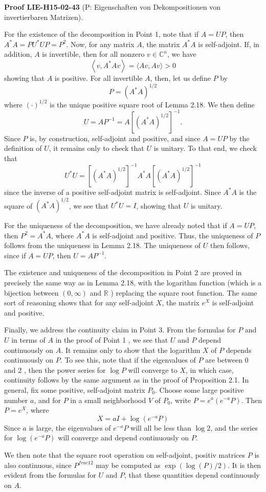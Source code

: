 \documentclass[10pt, letterpaper]{article}
\newcommand{\CustomHeading}[3]{%
  \par\medskip\noindent%
  \textbf{#1 #2} \textnormal{(#3)}.\enskip%
}
\newenvironment{PROOF}[2]{\begin{unitbox}\CustomHeading{Proof}{#1}{#2}}{\end{unitbox}}
\begin{document}
\begin{PROOF}{LIE-H15-02-43}{P: Eigenschaften von Dekompositionen von invertierbaren Matrizen}
For the existence of the decomposition in Point 1, note that if $A=U P$, then $A^{*} A=P U^{*} U P=P^{2}$. Now, for any matrix $A$, the matrix $A^{*} A$ is self-adjoint. If, in addition, $A$ is invertible, then for all nonzero $v \in \mathbb{C}^{n}$, we have
$$
\left\langle v, A^{*} A v\right\rangle=\langle A v, A v\rangle>0
$$
showing that $A$ is positive. For all invertible $A$, then, let us define $P$ by
$$
P=\left(A^{*} A\right)^{1 / 2}
$$
where $(\cdot)^{1 / 2}$ is the unique positive square root of Lemma 2.18. We then define
$$
U=A P^{-1}=A\left[\left(A^{*} A\right)^{1 / 2}\right]^{-1} .
$$
Since $P$ is, by construction, self-adjoint and positive, and since $A=U P$ by the definition of $U$, it remains only to check that $U$ is unitary. To that end, we check that
$$
U^{*} U=\left[\left(A^{*} A\right)^{1 / 2}\right]^{-1} A^{*} A\left[\left(A^{*} A\right)^{1 / 2}\right]^{-1}
$$
since the inverse of a positive self-adjoint matrix is self-adjoint. Since $A^{*} A$ is the square of $\left(A^{*} A\right)^{1 / 2}$, we see that $U^{*} U=I$, showing that $U$ is unitary.

For the uniqueness of the decomposition, we have already noted that if $A=U P$, then $P^{2}=A^{*} A$, where $A^{*} A$ is self-adjoint and positive. Thus, the uniqueness of $P$ follows from the uniqueness in Lemma 2.18. The uniqueness of $U$ then follows, since if $A=U P$, then $U=A P^{-1}$.

The existence and uniqueness of the decomposition in Point 2 are proved in precisely the same way as in Lemma 2.18, with the logarithm function (which is a bijection between $(0, \infty)$ and $\mathbb{R}$ ) replacing the square root function. The same sort of reasoning shows that for any self-adjoint $X$, the matrix $e^{X}$ is self-adjoint and positive.

Finally, we address the continuity claim in Point 3. From the formulas for $P$ and $U$ in terms of $A$ in the proof of Point 1 , we see that $U$ and $P$ depend continuously on $A$. It remains only to show that the logarithm $X$ of $P$ depends continuously on $P$. To see this, note that if the eigenvalues of $P$ are between 0 and 2 , then the power series for $\log P$ will converge to $X$, in which case, continuity follows by the same argument as in the proof of Proposition 2.1. In general, fix some positive, self-adjoint matrix $P_{0}$. Choose some large positive number $a$, and for $P$ in a small neighborhood $V$ of $P_{0}$, write $P=e^{a}\left(e^{-a} P\right)$. Then $P=e^{X}$, where
$$
X=a I+\log \left(e^{-a} P\right)
$$
Since $a$ is large, the eigenvalues of $e^{-a} P$ will all be less than $\log 2$, and the series for $\log \left(e^{-a} P\right)$ will converge and depend continuously on $P$.

We then note that the square root operation on self-adjoint, positiv matrices $P$ is also continuous, since $P^{frac{1}{2}}$ may be computed as $\exp(\log(P)/2)$. It is then evident from the formulas for $U$ and $P$, that these quantities depend continuously on $A$.
\end{PROOF}
\end{document}
